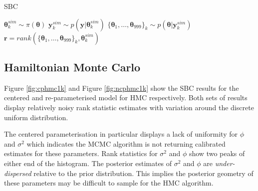 \documentclass[12pt, a4paper]{article}
\begin{document}
    \begin{algorithm}
        \caption{SBC}\label{alg:sbc}
        \begin{algorithmic}
                \State {} $\boldsymbol{\theta}^{sim}_k \sim\pi (\boldsymbol{\theta})$
                \State {} $\boldsymbol{y}^{sim}_k \sim p(\boldsymbol{y}|\boldsymbol{\theta}^{sim}_k)$
                \State {} $\{\boldsymbol{\theta}_1,\dots , \boldsymbol{\theta}_{999}\}_k \sim p(\boldsymbol{\theta} | \boldsymbol{y}^{sim}_k)$
                \State {} $\boldsymbol{r} = rank(\{\boldsymbol{\theta}_1,\dots , \boldsymbol{\theta}_{999}\}_k, \boldsymbol{\theta}^{sim}_k)$
              \EndFor
        \end{algorithmic}
        \end{algorithm}
        
    \subsection{Hamiltonian Monte Carlo}
    Figure \ref{fig:cphmc1k} and Figure \ref{fig:ncphmc1k} show the SBC results for the centered and re-parameterised model for HMC respectively. Both sets of results display relatively noisy rank statistic estimates with variation around the discrete uniform distribution.

    The centered parameterisation in particular displays a lack of uniformity for $\phi$ and $\sigma^2$ which indicates the MCMC algorithm is not returning calibrated estimates for these parameters. Rank statistics for $\sigma^2$ and $\phi$ show two peaks of either end of the histogram. The posterior estimates of $\sigma^2$ and $\phi$ are \textit{under-dispersed} relative to the prior distribution. This implies the posterior geometry of these parameters may be difficult to sample for the HMC algorithm.
\end{document}
